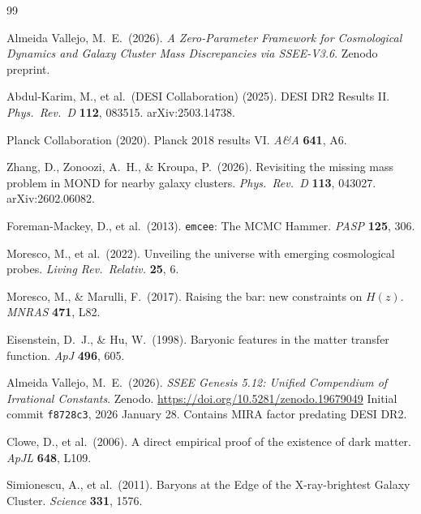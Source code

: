 \documentclass[12pt,a4paper]{article}
\begin{document}

\begin{thebibliography}{99}

Almeida Vallejo, M.~E.\ (2026).
\textit{A Zero-Parameter Framework for Cosmological Dynamics and
Galaxy Cluster Mass Discrepancies via SSEE-V3.6}. Zenodo preprint.

Abdul-Karim, M., et al.\ (DESI Collaboration) (2025).
DESI DR2 Results II.
\textit{Phys.\ Rev.\ D} \textbf{112}, 083515. arXiv:2503.14738.

Planck Collaboration (2020).
Planck 2018 results VI.
\textit{A\&A} \textbf{641}, A6.

Zhang, D., Zonoozi, A.~H., \& Kroupa, P.\ (2026).
Revisiting the missing mass problem in MOND for nearby galaxy clusters.
\textit{Phys.\ Rev.\ D} \textbf{113}, 043027. arXiv:2602.06082.

Foreman-Mackey, D., et al.\ (2013).
\texttt{emcee}: The MCMC Hammer.
\textit{PASP} \textbf{125}, 306.

Moresco, M., et al.\ (2022).
Unveiling the universe with emerging cosmological probes.
\textit{Living Rev.\ Relativ.} \textbf{25}, 6.

Moresco, M., \& Marulli, F.\ (2017).
Raising the bar: new constraints on $H(z)$.
\textit{MNRAS} \textbf{471}, L82.

Eisenstein, D.~J., \& Hu, W.\ (1998).
Baryonic features in the matter transfer function.
\textit{ApJ} \textbf{496}, 605.

Almeida Vallejo, M.~E.\ (2026).
\textit{SSEE Genesis 5.12: Unified Compendium of Irrational Constants}.
Zenodo. \url{https://doi.org/10.5281/zenodo.19679049}
Initial commit \texttt{f8728c3}, 2026 January 28.
Contains MIRA factor predating DESI DR2.

Clowe, D., et al.\ (2006).
A direct empirical proof of the existence of dark matter.
\textit{ApJL} \textbf{648}, L109.

Simionescu, A., et al.\ (2011).
Baryons at the Edge of the X-ray-brightest Galaxy Cluster.
\textit{Science} \textbf{331}, 1576.


\end{thebibliography}
\end{document}
